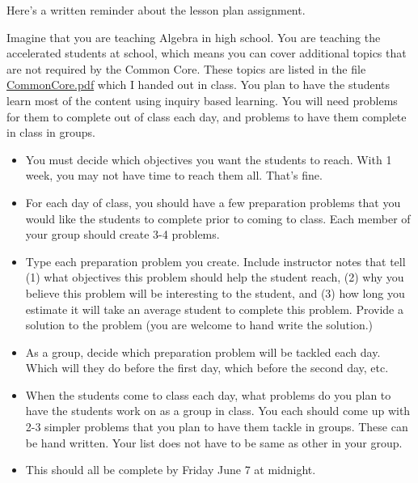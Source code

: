 \documentclass[letterpaper,oneside]{book}%
\theoremstyle{plain}
\theoremstyle{box}
\theoremstyle{problem}
\newtheorem*{problemnum*}{Problem}
\newenvironment{problem*}[1][]{\begin{problemnum*}[#1]}{\end{problemnum*}\nopagebreak\hrule\bigskip}
\begin{document}
\begin{problem*}
 Here's a written reminder about the lesson plan assignment.  
 
 Imagine that you are teaching Algebra in high school.  You are teaching the accelerated students at school, which means you can cover additional topics that are not required by the Common Core.  These topics are listed in the file \href{https://www.dropbox.com/s/3fkhwosi5xjhl3o/CommonCore.pdf}{CommonCore.pdf} which I handed out in class. You plan to have the students learn most of the content using inquiry based learning.  You will need problems for them to complete out of class each day, and problems to have them complete in class in groups.
 \begin{itemize}
  \item You must decide which objectives you want the students to reach.  With 1 week, you may not have time to reach them all. That's fine.
  \item For each day of class, you should have a few preparation problems that you would like the students to complete prior to coming to class.   Each member of your group should create 3-4 problems.
  \item Type each preparation problem you create. Include instructor notes that tell (1) what objectives this problem should help the student reach, (2) why you believe this problem will be interesting to the student, and (3) how long you estimate it will take an average student to complete this problem. Provide a solution to the problem (you are welcome to hand write the solution.)
  \item As a group, decide which preparation problem will be tackled each day.  Which will they do before the first day, which before the second day, etc.  
  \item When the students come to class each day, what problems do you plan to have the students work on as a group in class. You each should come up with 2-3 simpler problems that you plan to have them tackle in groups.  These can be hand written. Your list does not have to be same as other in your group.
  \item  This should all be complete by Friday June 7 at midnight.
 \end{itemize}

\end{problem*}
\end{document}
